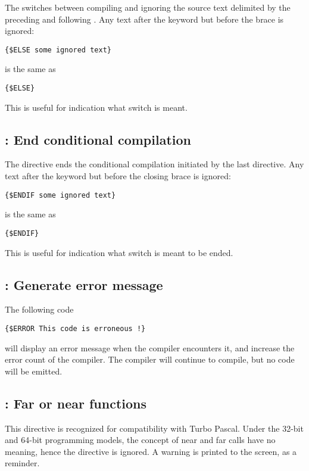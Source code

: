 The  switches between compiling and ignoring the source
text delimited by the preceding  and following
. Any text after the  keyword but before the
brace is ignored:
\begin{verbatim}
{$ELSE some ignored text}
\end{verbatim}
is the same as
\begin{verbatim}
{$ELSE}
\end{verbatim}
This is useful for indication what switch is meant.

\subsection{ : End conditional compilation}

The  directive ends the conditional compilation initiated by the
last  directive. Any text after the  keyword but
before the closing brace is ignored:
\begin{verbatim}
{$ENDIF some ignored text}
\end{verbatim}
is the same as
\begin{verbatim}
{$ENDIF}
\end{verbatim}
This is useful for indication what switch is meant to be ended.

\subsection{ : Generate error message}

The following code
\begin{verbatim}
{$ERROR This code is erroneous !}
\end{verbatim}
will display an error message when the compiler encounters it,
and increase the error count of the compiler.
The compiler will continue to compile, but no code will be emitted.

\subsection{ : Far or near functions}
This directive is recognized for compatibility with Turbo Pascal. Under the
32-bit and 64-bit programming models, the concept of near and far calls have
no meaning, hence the directive is ignored. A warning is printed to the screen, 
as a reminder.

